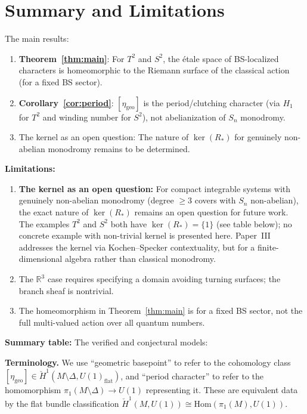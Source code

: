 \documentclass[11pt]{article}
\begin{document}
\section{Summary and Limitations}

The main results:

\begin{enumerate}
  \item \textbf{Theorem~\ref{thm:main}}: For $T^2$ and $S^2$, the étale space
        of BS-localized characters is homeomorphic to the Riemann surface
        of the classical action (for a fixed BS sector).
  \item \textbf{Corollary~\ref{cor:period}}: $[\eta_{\mathrm{geo}}]$ is the period/clutching
        character (via $H_1$ for $T^2$ and winding number for $S^2$),
        not abelianization of $S_n$ monodromy.
  \item The kernel as an open question: The nature of $\ker(R_*)$ for genuinely non-abelian monodromy remains to be determined.
\end{enumerate}

\textbf{Limitations:}
\begin{enumerate}
  \item \textbf{The kernel as an open question:} For compact integrable systems with
        genuinely non-abelian monodromy (degree $\geq 3$ covers with $S_n$ non-abelian),
        the exact nature of $\ker(R_*)$ remains an open question for future work.
        The examples $T^2$ and $S^2$ both have $\ker(R_*) = \{1\}$ (see table below);
        no concrete example with non-trivial kernel is presented here.
        Paper~III addresses the kernel via Kochen--Specker contextuality, but for a
        finite-dimensional algebra rather than classical monodromy.

  \item The $\mathbb{R}^3$ case requires specifying a domain avoiding
        turning surfaces; the branch sheaf is nontrivial.
  \item The homeomorphism in Theorem~\ref{thm:main} is for a fixed BS sector,
        not the full multi-valued action over all quantum numbers.
\end{enumerate}

\textbf{Summary table:} The verified and conjectural models:

\textbf{Terminology.} We use ``geometric basepoint'' to refer to the cohomology class $[\eta_{\mathrm{geo}}] \in \check{H}^1(M \setminus \Delta, U(1)_{\mathrm{flat}})$, and ``period character'' to refer to the homomorphism $\pi_1(M \setminus \Delta) \to U(1)$ representing it. These are equivalent data by the flat bundle classification $\check{H}^1(M, U(1)) \cong \mathrm{Hom}(\pi_1(M), U(1))$.
\end{document}
